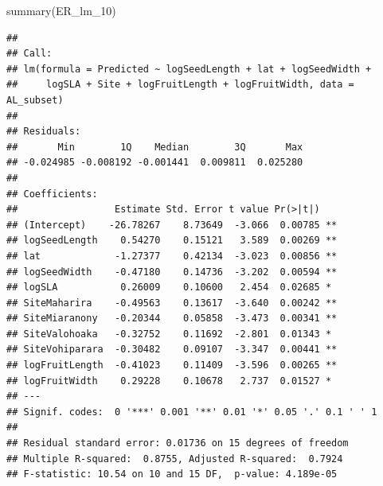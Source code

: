 \documentclass[
  12pt,
]{article}
\newenvironment{Shaded}{\begin{snugshade}}{\end{snugshade}}
\newcommand{\FunctionTok}[1]{\textcolor[rgb]{0.00,0.00,0.00}{#1}}
\newcommand{\NormalTok}[1]{#1}
\begin{document}
\begin{Shaded}
\begin{Highlighting}[]
\FunctionTok{summary}\NormalTok{(ER\_lm\_10)}
\end{Highlighting}
\end{Shaded}

\begin{verbatim}
## 
## Call:
## lm(formula = Predicted ~ logSeedLength + lat + logSeedWidth + 
##     logSLA + Site + logFruitLength + logFruitWidth, data = AL_subset)
## 
## Residuals:
##       Min        1Q    Median        3Q       Max 
## -0.024985 -0.008192 -0.001441  0.009811  0.025280 
## 
## Coefficients:
##                 Estimate Std. Error t value Pr(>|t|)   
## (Intercept)    -26.78267    8.73649  -3.066  0.00785 **
## logSeedLength    0.54270    0.15121   3.589  0.00269 **
## lat             -1.27377    0.42134  -3.023  0.00856 **
## logSeedWidth    -0.47180    0.14736  -3.202  0.00594 **
## logSLA           0.26009    0.10600   2.454  0.02685 * 
## SiteMaharira    -0.49563    0.13617  -3.640  0.00242 **
## SiteMiaranony   -0.20344    0.05858  -3.473  0.00341 **
## SiteValohoaka   -0.32752    0.11692  -2.801  0.01343 * 
## SiteVohiparara  -0.30482    0.09107  -3.347  0.00441 **
## logFruitLength  -0.41023    0.11409  -3.596  0.00265 **
## logFruitWidth    0.29228    0.10678   2.737  0.01527 * 
## ---
## Signif. codes:  0 '***' 0.001 '**' 0.01 '*' 0.05 '.' 0.1 ' ' 1
## 
## Residual standard error: 0.01736 on 15 degrees of freedom
## Multiple R-squared:  0.8755, Adjusted R-squared:  0.7924 
## F-statistic: 10.54 on 10 and 15 DF,  p-value: 4.189e-05
\end{verbatim}
\end{document}
